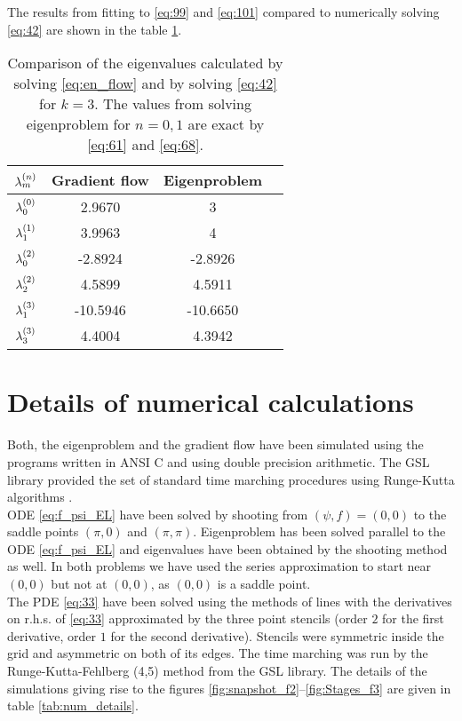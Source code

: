 The results from fitting to \eqref{eq:99} and \eqref{eq:101} compared
to numerically solving \eqref{eq:42} are shown in the table
\ref{tab:Lambda_comp}.

\begin{table}[h]
  \centering
  \begin{tabular}{| c | c | c | c |}\hline
    $\lb{n}{m}$ & Gradient flow  &  Eigenproblem  \\\hline
    $\lb{0}{0}$ & 2.9670  & 3 \\\hline
    $\lb{1}{1}$ & 3.9963  & 4 \\\hline
    $\lb{2}{0}$ & -2.8924  & -2.8926 \\\hline
    $\lb{2}{2}$ & 4.5899  & 4.5911  \\\hline
    $\lb{3}{1}$ & -10.5946  & -10.6650  \\\hline
    $\lb{3}{3}$ & 4.4004 & 4.3942 \\\hline
  \end{tabular}
  \caption{Comparison of the eigenvalues calculated by solving
    \eqref{eq:en_flow} and by solving \eqref{eq:42} for $k=3$. The
    values from solving eigenproblem for $n=0,1$ are exact by
    \eqref{eq:61} and \eqref{eq:68}.}
  \label{tab:Lambda_comp}
\end{table}


\section{Details of numerical calculations}
\label{sec:deta-numer-calc}

Both, the eigenproblem and the gradient flow have been simulated using
the programs written in ANSI C and using double precision
arithmetic. The GSL library provided the set of standard time marching
procedures using Runge-Kutta algorithms \cite{Galassi}.\\

ODE \eqref{eq:f_psi_EL} have been solved by shooting from
$(\psi,f)=(0,0)$ to the saddle points $(\pi,0)$ and $(\pi,\pi)$.
Eigenproblem has been solved parallel to the ODE \eqref{eq:f_psi_EL}
and eigenvalues have been obtained by the shooting method as well. In
both problems we have used the series approximation to start near
$(0,0)$ but not at $(0,0)$, as $(0,0)$ is a saddle point.\\

The PDE \eqref{eq:33} have been solved using the methods of lines with
the derivatives on r.h.s. of \eqref{eq:33} approximated by the three
point stencils (order $2$ for the first derivative, order $1$ for the
second derivative). Stencils were symmetric inside the grid and
asymmetric on both of its edges. The time marching was run by the
Runge-Kutta-Fehlberg (4,5) method from the GSL
library\cite{Galassi}. The details of the simulations giving rise to
the figures \ref{fig:snapshot_f2}--\ref{fig:Stages_f3} are given in
table \ref{tab:num_details}.



